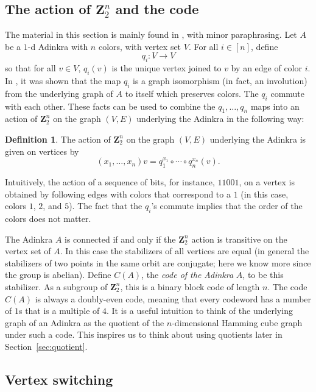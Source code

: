 \documentclass[12pt,twoside,singlespace]{article}
\numberwithin{equation}{section}
\theoremstyle{definition}
\newtheorem{definition}[equation]{Definition}
\newcommand{\ZZ}{\mathbf{Z}}
\begin{document}
\subsection{The action of $\ZZ_2^n$ and the code}
\label{sec:code}
The material in this section is mainly found in \cite{d2l:omni,zhang:adinkras}, with minor paraphrasing.  Let $A$ be a $1$-d Adinkra with $n$ colors, with vertex set $V$.  For all $i\in [n]$, define
\[q_i:V\to V\]
so that for all $v\in V$, $q_i(v)$ is the unique vertex joined to $v$ by an edge of color $i$.  In \cite{d2l:omni}, it was shown that the map $q_i$ is a graph isomorphism (in fact, an involution) from the underlying graph of $A$ to itself which preserves colors. The $q_i$ commute with each other. These facts can be used to combine the $q_1,\ldots, q_n$ maps into an action of $\ZZ_2^n$ on the graph $(V,E)$ underlying the Adinkra in the following way:
\begin{definition}
The action of $\ZZ_2^n$ on the graph $(V,E)$ underlying the Adinkra is given on vertices by
\[(x_1,\ldots,x_n)v=q_1^{x_1}\circ\cdots\circ q_n^{x_n}(v).\]
\end{definition}

Intuitively, the action of a sequence of bits, for instance, $11001$, on a vertex is obtained by following edges with colors that correspond to a $1$ (in this case, colors $1$, $2$, and $5$).  The fact that the $q_i$'s commute implies that the order of the colors does not matter.

The Adinkra $A$ is connected if and only if the $\ZZ_2^n$ action is transitive on the vertex set of $A$.  In this case the stabilizers of all vertices are equal (in general the stabilizers of two points in the same orbit are conjugate; here we know more since the group is abelian).  Define $C(A)$, the \emph{code of the Adinkra} $A$, to be this stabilizer.  As a subgroup of $\ZZ_2^n$, this is a binary block code of length $n$.  The code $C(A)$ is always a doubly-even code\cite{d2l:omni,d2l:decodes}, meaning that every codeword has a number of $1$s that is a multiple of $4$. It is a useful intuition to think of the underlying graph of an Adinkra as the quotient of the $n$-dimensional Hamming cube graph under such a code\cite{d2l:omni,zhang:adinkras}. This inspires us to think about using quotients later in Section~\ref{sec:quotient}.


\subsection{Vertex switching}
\label{sec:vertexswitch}
\end{document}
